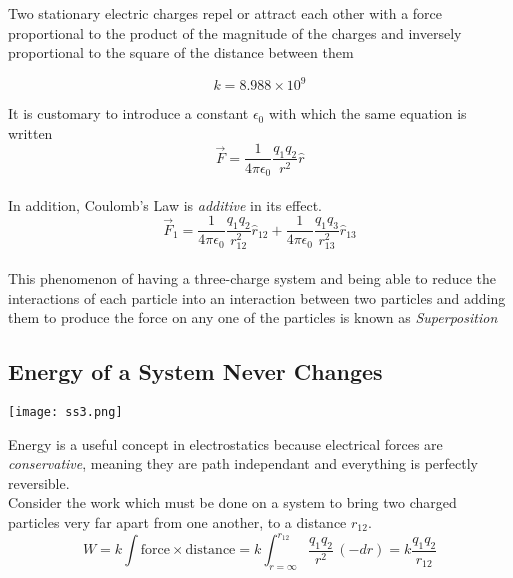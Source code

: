 \documentclass[svgnames]{article}
\begin{document}
Two stationary electric charges repel or attract each other with a force
proportional to the product of the magnitude of the charges and inversely
proportional to the square of the distance between them

\[ k = 8.988 \times 10^9 \] 
 
It is customary to introduce a constant $\epsilon_0$ with which the same equation is written \\ 

\[ \vec{F} = \frac{1}{4\pi \epsilon_0}\frac{q_1q_2}{r^2}\hat{r} \] \\

In addition, Coulomb's Law is \textit{additive} in its effect. \\

\[ \vec{F}_1 = \frac{1}{4\pi \epsilon_0}\frac{q_1q_2}{r_{12}^2}\hat{r}_{12}
+ \frac{1}{4\pi \epsilon_0}\frac{q_1q_3}{r_{13}^2}\hat{r}_{13} \] \\

This phenomenon of having a three-charge system and being able to reduce the
interactions of each particle into an interaction between two particles and
adding them to produce the force on any one of the particles is known as \textit{Superposition} 

\subsection{Energy of a System Never Changes}

\vspace{20px}

\begin{center}
\texttt{[image: ss3.png]}
\end{center} 


\vspace{20px}

Energy is a useful concept in electrostatics because electrical forces are
\textit{conservative}, meaning they are path independant and everything is perfectly reversible. \\ 

Consider the work which must be done on a system to bring two charged particles
very far apart from one another, to a distance $r_{12}$. \\

\[ W = k \int \text{force} \times \text{distance} = k\int_{r = \infty}^{r_{12}}
\frac{q_1q_2}{r^2}\,(-dr) = k\frac{q_1q_2}{r_{12}} \] \\
\end{document}
